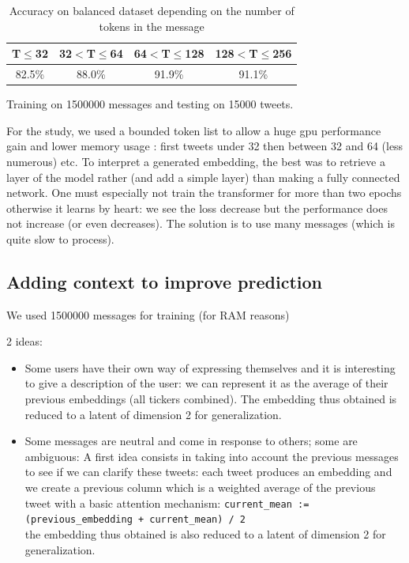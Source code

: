 \documentclass{article}
\begin{document}
\begin{table}[H]
\caption{Accuracy on balanced dataset depending on the number of tokens in the message}
\centering
\begin{tabular}{cccc}
\toprule
T$\le$32 & 32$<$T$\le$64 & 64$<$T$\le$128 & 128$<$T$\le$256 \\
\midrule
82.5\% & 88.0\% & 91.9\% & 91.1\% \\
\bottomrule
\end{tabular}

\vspace{2mm}
{\centering \small Training on 1500000 messages and testing on 15000 tweets.\par}

\end{table}
\vspace{3mm}
For the study, we used a bounded token list to allow a huge gpu performance gain and lower memory usage : first tweets under 32 then between 32 and 64 (less numerous) etc.
To interpret a generated embedding, the best was to retrieve a layer of the model rather (and add a simple layer) than making a fully connected network.
One must especially not train the transformer for more than two epochs otherwise it learns by heart: we see the loss decrease but the performance does not increase (or even decreases). The solution is to use many messages (which is quite slow to process).

\subsection{Adding context to improve prediction}

We used 1500000 messages for training (for RAM reasons)

2 ideas:
\begin{itemize}

    \item Some users have their own way of expressing themselves and it is interesting to give a description of the user: we can represent it as the average of their previous embeddings (all tickers combined). The embedding thus obtained is reduced to a latent of dimension 2 for generalization.
    
    \item Some messages are neutral and come in response to others; some are ambiguous: A first idea consists in taking into account the previous messages to see if we can clarify these tweets: each tweet produces an embedding and we create a previous column which is a weighted average of the previous tweet with a basic attention mechanism:
    \texttt{current\_mean := (previous\_embedding + current\_mean) / 2}\\
    the embedding thus obtained is also reduced to a latent of dimension 2 for generalization.

\end{itemize}
\end{document}
